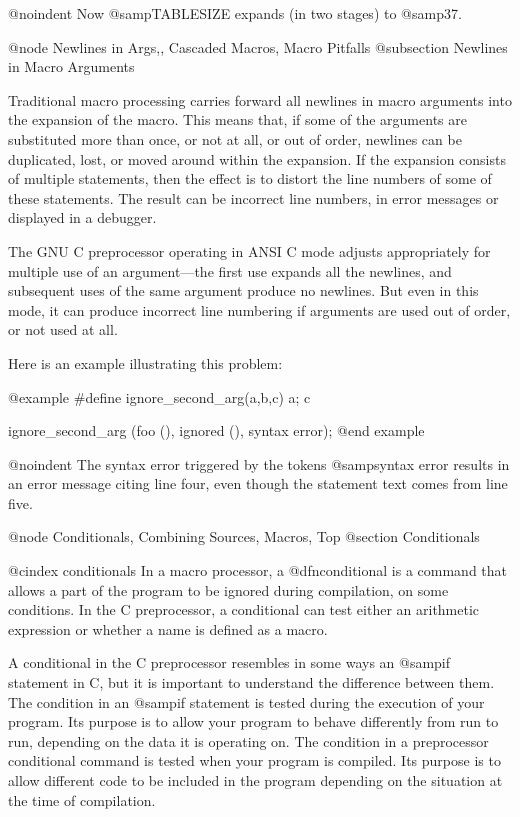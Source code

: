 {{@noindent
Now @samp{TABLESIZE} expands (in two stages) to @samp{37}.

@node Newlines in Args,, Cascaded Macros, Macro Pitfalls
@subsection Newlines in Macro Arguments

Traditional macro processing carries forward all newlines in macro
arguments into the expansion of the macro.  This means that, if some of
the arguments are substituted more than once, or not at all, or out of
order, newlines can be duplicated, lost, or moved around within the
expansion.  If the expansion consists of multiple statements, then the
effect is to distort the line numbers of some of these statements.  The
result can be incorrect line numbers, in error messages or displayed in
a debugger.

The GNU C preprocessor operating in ANSI C mode adjusts appropriately
for multiple use of an argument---the first use expands all the
newlines, and subsequent uses of the same argument produce no newlines.
But even in this mode, it can produce incorrect line numbering if
arguments are used out of order, or not used at all.

Here is an example illustrating this problem:

@example
#define ignore_second_arg(a,b,c) a; c

ignore_second_arg (foo (),
                   ignored (),
                   syntax error);
@end example

@noindent
The syntax error triggered by the tokens @samp{syntax error} results
in an error message citing line four, even though the statement text
comes from line five.

@node Conditionals, Combining Sources, Macros, Top
@section Conditionals

@cindex conditionals
In a macro processor, a @dfn{conditional} is a command that allows a part
of the program to be ignored during compilation, on some conditions.
In the C preprocessor, a conditional can test either an arithmetic expression
or whether a name is defined as a macro.

A conditional in the C preprocessor resembles in some ways an @samp{if}
statement in C, but it is important to understand the difference between
them.  The condition in an @samp{if} statement is tested during the execution
of your program.  Its purpose is to allow your program to behave differently
from run to run, depending on the data it is operating on.  The condition
in a preprocessor conditional command is tested when your program is compiled.
Its purpose is to allow different code to be included in the program depending
on the situation at the time of compilation.

}}
